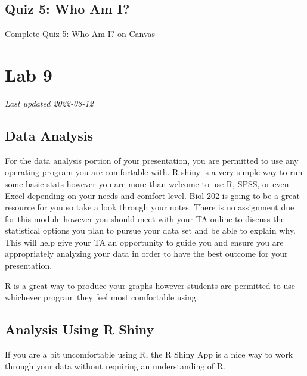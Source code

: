 \documentclass[
]{book}
\begin{document}
\hypertarget{quiz-5-who-am-i}{%
\chapter*{Quiz 5: Who Am I?}\label{quiz-5-who-am-i}}

Complete Quiz 5: Who Am I? on \href{https://canvas.ubc.ca/courses/113910}{Canvas}

\hypertarget{part-lab-9}{%
\part*{Lab 9}\label{part-lab-9}}

\emph{Last updated 2022-08-12}

\hypertarget{data-analysis}{%
\chapter*{Data Analysis}\label{data-analysis}}

For the data analysis portion of your presentation, you are permitted to use any operating program you are comfortable with. R shiny is a very simple way to run some basic stats however you are more than welcome to use R, SPSS, or even Excel depending on your needs and comfort level. Biol 202 is going to be a great resource for you so take a look through your notes. There is no assignment due for this module however you should meet with your TA online to discuss the statistical options you plan to pursue your data set and be able to explain why. This will help give your TA an opportunity to guide you and ensure you are appropriately analyzing your data in order to have the best outcome for your presentation.

R is a great way to produce your graphs however students are permitted to use whichever program they feel most comfortable using.

\hypertarget{analysis-using-r-shiny}{%
\chapter*{Analysis Using R Shiny}\label{analysis-using-r-shiny}}

If you are a bit uncomfortable using R, the R Shiny App is a nice way to work through your data without requiring an understanding of R.
\end{document}
